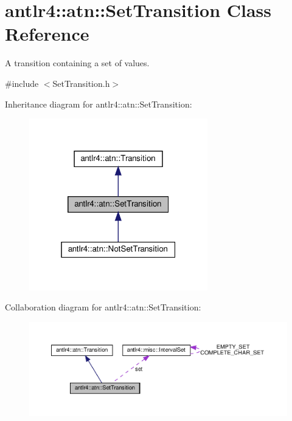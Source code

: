 \hypertarget{classantlr4_1_1atn_1_1SetTransition}{}\section{antlr4\+:\+:atn\+:\+:Set\+Transition Class Reference}
\label{classantlr4_1_1atn_1_1SetTransition}


A transition containing a set of values.  




{\ttfamily \#include $<$Set\+Transition.\+h$>$}



Inheritance diagram for antlr4\+:\+:atn\+:\+:Set\+Transition\+:
\nopagebreak
\begin{figure}[H]
\begin{center}
\leavevmode
\includegraphics[width=220pt]{classantlr4_1_1atn_1_1SetTransition__inherit__graph}
\end{center}
\end{figure}


Collaboration diagram for antlr4\+:\+:atn\+:\+:Set\+Transition\+:
\nopagebreak
\begin{figure}[H]
\begin{center}
\leavevmode
\includegraphics[width=350pt]{classantlr4_1_1atn_1_1SetTransition__coll__graph}
\end{center}
\end{figure}
